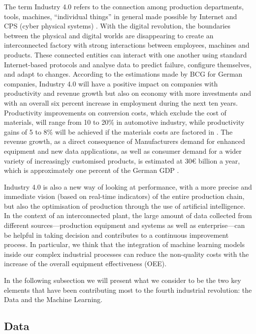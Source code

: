 The term Industry 4.0 refers to the connection among production departments, tools, machines, “individual things” in general made possible by Internet and CPS (cyber physical systems) \citep{schlapfer2015industry} .
With the digital revolution, the boundaries between the physical and digital worlds are disappearing to create an interconnected factory with strong interactions between employees, machines and products. These connected entities can interact with one another using standard Internet-based protocols and analyse data to predict failure, configure themselves, and adapt to changes.
According to the estimations made by BCG for German companies, Industry 4.0 will have a positive impact on companies with productivity and revenue growth but also on economy with more investments and with an overall six percent increase in employment during the next ten years. Productivity improvements on conversion costs, which exclude the cost of materials, will range from 10 to 20\% in automotive industry, while productivity gains of 5 to 8\% will be achieved if the materials costs are factored in \citep{lorenz2016time}. The revenue growth, as a direct consequence of  Manufacturers demand for enhanced equipment and new data applications, as well as consumer demand for a wider variety of increasingly customised products, is estimated at 30€ billion a year, which is approximately one percent of the German GDP \citep{russmann2015industry}. 

Industry 4.0 is also a new way of looking at performance, with a more precise and immediate vision (based on real-time indicators) of the entire production chain, but also the optimisation of production through the use of artificial intelligence. In the context of an interconnected plant, the large amount of data collected from different sources—production equipment and systems as well as enterprise—can be helpful in taking decision and contributes to a continuous improvement process. In particular, we think that the integration of machine learning models inside our complex industrial processes can reduce the non-quality costs with the increase of the overall equipment effectiveness (OEE). 

In the following subsection we will present what we consider to be the two key elements that have been contributing most to the fourth industrial revolution: the Data and the Machine Learning.


\subsection{Data}

